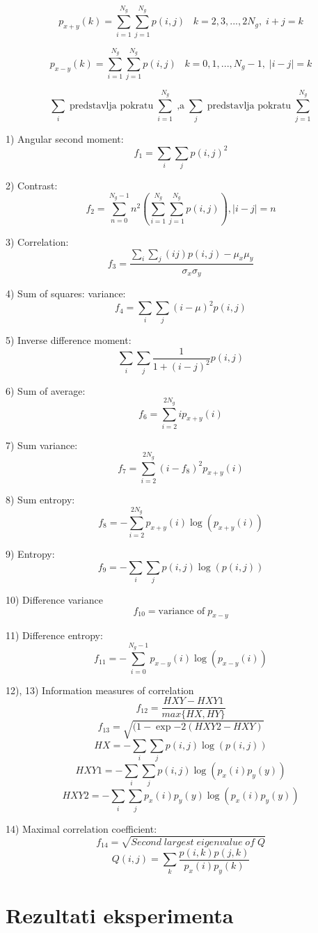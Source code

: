 \documentclass[times, utf8, zavrsni, numeric]{fer}
\begin{document}
\[
p_{x+y}(k)=\sum_{i=1}^{N_g} \sum_{j=1}^{N_g} p(i,j) \;\;\; k=2,3,...,2N_g, \; i+j=k
\]

\[
p_{x-y}(k)=\sum_{i=1}^{N_g} \sum_{j=1}^{N_g} p(i,j) \;\;\; k=0,1,...,N_g-1, \; \left|i-j\right|=k
\]

\[
\sum_i \; \textrm{predstavlja pokratu} \; \sum_{i=1}^{N_g} \; \textrm{,a} \;
\sum_{j} \; \textrm{predstavlja pokratu} \; \sum_{j=1}^{N_g}
\]

\newpage

1) Angular second moment:
\[
f_1 = \sum_{i}\sum_{j}p(i,j)^2
\]

2) Contrast:
\[
f_2 = \sum_{n=0}^{N_g-1}n^2 \left( \sum_{i=1}^{N_g}\sum_{j=1}^{N_g}p(i,j) \right), \left| i-j \right| = n
\]

3) Correlation:
\[
f_3 = \frac{\sum_i\sum_j\left(ij\right)p(i,j) - \mu_x\mu_y}{\sigma_x\sigma_y}
\]

4) Sum of squares: variance:
\[
f_4 = \sum_i\sum_j(i-\mu)^2p(i,j)
\]

5) Inverse difference moment:
\[
\sum_i\sum_j \frac{1}{1+(i-j)^2}p(i,j)
\]

6) Sum of average:
\[
f_6 = \sum_{i=2}^{2N_g}ip_{x+y}(i)
\]

7) Sum variance:
\[
f_7 = \sum_{i=2}^{2N_g}(i-f_8)^2p_{x+y}(i)
\]

8) Sum entropy:
\[
f_8 = -\sum_{i=2}^{2N_g}p_{x+y}(i)\log(p_{x+y}(i))
\]

9) Entropy:
\[
f_9 = -\sum_i\sum_j p(i,j)\log(p(i,j))
\]

10) Difference variance
\[
f_{10} = \textrm{variance of} \; p_{x-y}
\]

11) Difference entropy:
\[
f_{11} = -\sum_{i=0}^{N_g-1}p_{x-y}(i)\log(p_{x-y}(i)) 
\]

12), 13) Information measures of correlation
\[
f_{12} = \frac{HXY - HXY1}{max\{HX,HY\}}
\]
\[
f_{13} = \sqrt{(1-\exp{-2(HXY2 - HXY)}}
\]
\[
HX = -\sum_i\sum_j p(i,j)\log(p(i,j))
\]
\[
HXY1 = -\sum_i\sum_j p(i,j)\log(p_x(i)p_y(y))
\]
\[
HXY2 = -\sum_i\sum_j p_x(i)p_y(y) \log(p_x(i)p_y(y))
\]

14) Maximal correlation coefficient:
\[
f_{14} = \sqrt{Second \; largest \; eigenvalue \; of \; Q}
\]
\[
Q(i,j) = \sum_k \frac{p(i,k)p(j,k)}{p_x(i)p_y(k)}
\]

\chapter{Rezultati eksperimenta}
\end{document}
